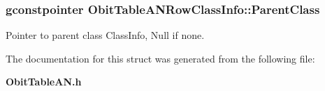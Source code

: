 \subsubsection{\setlength{\rightskip}{0pt plus 5cm}gconstpointer {\bf Obit\-Table\-ANRow\-Class\-Info::Parent\-Class}}\label{structObitTableANRowClassInfo_o3}


Pointer to parent class Class\-Info, Null if none. 



The documentation for this struct was generated from the following file:\begin{CompactItemize}
\item 
{\bf Obit\-Table\-AN.h}\end{CompactItemize}
